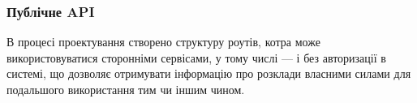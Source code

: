 \subsubsection{Публічне API}

В процесі проектування створено структуру роутів, котра може використовуватися сторонніми сервісами, у тому числі — і без авторизації в системі, що дозволяє отримувати інформацію про розклади власними силами для подальшого використання тим чи іншим чином. 